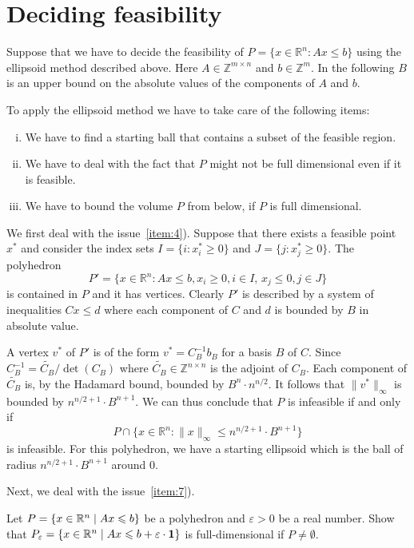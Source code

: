 \section{Deciding feasibility}
\label{sec:deciding-feasibility}
Suppose that we have to decide the feasibility of $P = \{x ∈  ℝ^n : Ax ≤ b\}$
using the ellipsoid method described above. Here $A ∈ ℤ^{m ×n}$
and $b ∈ ℤ^{m}$.
In the following $B$
is an upper bound on the absolute values of the components of $A$
and $b$.

To apply the ellipsoid method we have to take care of the following items: 
\begin{enumerate}[i)]
\item We have to find a starting ball that contains a subset of the feasible region. \label{item:4}
\item We have to deal with the fact that $P$ might not be full dimensional even if it is feasible.  \label{item:7}
\item We have to bound the volume $P$ from below, if $P$ is full dimensional. \label{item:8}
\end{enumerate}


We first deal with the issue~\ref{item:4}). 
Suppose that there exists a feasible point $x^*$ and consider the index sets 
$I = \{ i : x^*_i ≥0 \}$ and $J = \{j : x^*_j ≥0\}$.    The polyhedron 
\begin{displaymath}
P' =   \{ x ∈ ℝ^n : Ax ≤b, x_i ≥ 0, i ∈ I, \, x_j ≤ 0, j ∈ J\}
\end{displaymath}
is contained in $P$ and it has vertices. Clearly $P'$ is described by a system of inequalities $Cx≤d$ where each component of $C$ and $d$ is bounded by $B$ in absolute value. 

A vertex $v^*$ of $P'$ is of the form $v^* = C_B^{-1} b_B$ for a basis $B$ of $C$. Since $C_B^{-1} = \widetilde{C_B} / \det(C_B)$ where $\widetilde{C_B} \in ℤ^{n ×n}$ is the adjoint of $C_B$. Each component of $\widetilde{C_B}$ is, by the Hadamard bound, bounded by $B^n ⋅ n^{n/2}$.  It follows that $\|v^*\|_∞$ is bounded by 
 $n^{n/2+1} ⋅ B^{n+1}$. We can thus conclude that $P$ is infeasible if and only if 
 \begin{displaymath}
   P ∩ \{ x ∈ ℝ^n : \|x\|_∞ ≤ n^{n/2+1} ⋅ B^{n+1} \}
 \end{displaymath}
is infeasible. 
For this polyhedron, we have a starting ellipsoid which is the ball of radius $n^{n/2+1} ⋅ B^{n+1} $ around $0$.  


Next, we deal with the issue~\ref{item:7}). 
\begin{exercise}
  \label{el:ex:11}
  Let $P = \{ x \in \mathbb{R}^n \mid Ax\leqslant b\}$ be a polyhedron and $\varepsilon>0$ be a
  real number. Show that $P_\varepsilon = \{ x \in \mathbb{R}^n \mid Ax\leqslant b+ \varepsilon\cdot
  \mathbf{1}\}$ is full-dimensional if $P \neq \emptyset$.
\end{exercise}


